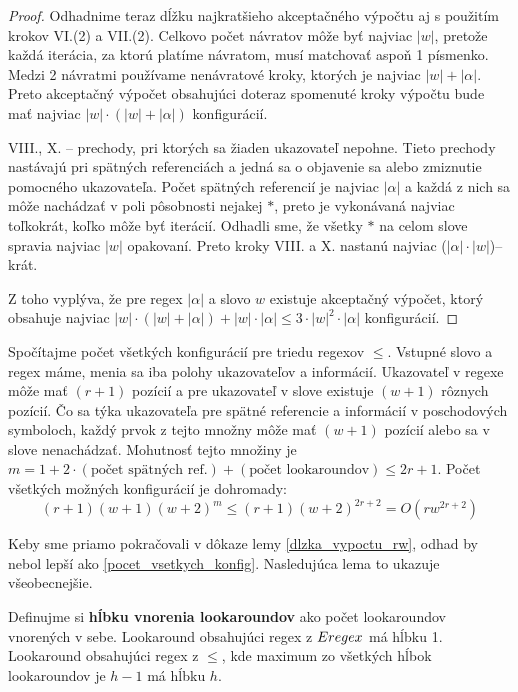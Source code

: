 \begin{proof}
Odhadnime teraz dĺžku najkratšieho akceptačného výpočtu aj s použitím krokov VI.(2) a VII.(2). Celkovo počet návratov môže byť najviac $|w|$, pretože každá iterácia, za ktorú platíme návratom, musí matchovať aspoň 1 písmenko. Medzi 2 návratmi používame nenávratové kroky, ktorých je najviac $|w|+|\alpha|$. Preto akceptačný výpočet obsahujúci doteraz spomenuté kroky výpočtu bude mať najviac $|w|\cdot(|w|+|\alpha|)$ konfigurácií.

VIII., X. -- prechody, pri ktorých sa žiaden ukazovateľ nepohne. Tieto prechody nastávajú pri spätných referenciách a jedná sa o objavenie sa alebo zmiznutie pomocného ukazovateľa. Počet spätných referencií je najviac $|\alpha|$ a každá z nich sa môže nachádzať v poli pôsobnosti nejakej $*$, preto je vykonávaná najviac toľkokrát, koľko môže byť iterácií. Odhadli sme, že všetky $*$ na celom slove spravia najviac $|w|$ opakovaní. Preto kroky VIII. a X. nastanú najviac ($|\alpha|\cdot|w|$)--krát.

Z toho vyplýva, že pre regex $|\alpha|$ a slovo $w$ existuje akceptačný výpočet, ktorý obsahuje najviac $|w|\cdot(|w|+|\alpha|)+|w|\cdot|\alpha| \leq 3\cdot |w|^2 \cdot |\alpha| $ konfigurácií.
\end{proof}

Spočítajme počet všetkých konfigurácií pre triedu regexov $\le$. Vstupné slovo a regex máme, menia sa iba polohy ukazovateľov a informácií. Ukazovateľ v regexe môže mať $(r+1)$ pozícií a pre ukazovateľ v slove existuje $(w+1)$ rôznych pozícií. Čo sa týka ukazovateľa pre spätné referencie a informácií v poschodových symboloch, každý prvok z tejto množny môže mať $(w+1)$ pozícií alebo sa v slove nenachádzať. Mohutnosť tejto množiny je $m = 1+2\cdot(\text{počet spätných ref.})+(\text{počet lookaroundov})\leq 2r+1$. Počet všetkých možných konfigurácií je dohromady: 
\begin{equation}\label{pocet_vsetkych_konfig}
(r+1)(w+1)(w+2)^m \leq (r+1)(w+2)^{2r+2} = O(rw^{2r+2})
\end{equation}

Keby sme priamo pokračovali v dôkaze lemy \ref{dlzka_vypoctu_rw}, odhad by nebol lepší ako \ref{pocet_vsetkych_konfig}. Nasledujúca lema to ukazuje všeobecnejšie.

Definujme si \textbf{hĺbku vnorenia lookaroundov} ako počet lookaroundov vnorených v sebe. Lookaround obsahujúci regex z $Eregex$ má hĺbku 1. Lookaround obsahujúci regex z $\le$, kde maximum zo všetkých hĺbok lookaroundov je $h-1$ má hĺbku $h$.

